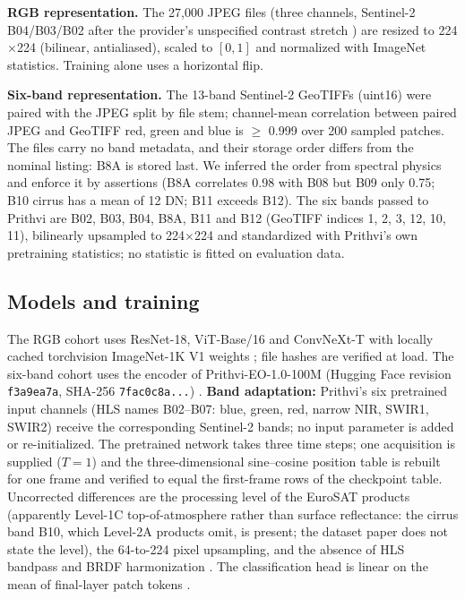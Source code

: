 \documentclass[3p,times,procedia]{elsarticle}
\begin{document}
\textbf{RGB representation.} The 27,000 JPEG files (three channels, Sentinel-2 B04/B03/B02 after the provider's unspecified contrast stretch \cite{eurosat}) are resized to 224$\times$224 (bilinear, antialiased), scaled to $[0,1]$ and normalized with ImageNet statistics. Training alone uses a horizontal flip.

\textbf{Six-band representation.} The 13-band Sentinel-2 GeoTIFFs (uint16) were paired with the JPEG split by file stem; channel-mean correlation between paired JPEG and GeoTIFF red, green and blue is $\ge$ 0.999 over 200 sampled patches. The files carry no band metadata, and their storage order differs from the nominal listing: B8A is stored last. We inferred the order from spectral physics and enforce it by assertions (B8A correlates 0.98 with B08 but B09 only 0.75; B10 cirrus has a mean of 12 DN; B11 exceeds B12). The six bands passed to Prithvi are B02, B03, B04, B8A, B11 and B12 (GeoTIFF indices 1, 2, 3, 12, 10, 11), bilinearly upsampled to 224$\times$224 and standardized with Prithvi's own pretraining statistics; no statistic is fitted on evaluation data.

\subsection{Models and training}\label{sec:models}
The RGB cohort uses ResNet-18, ViT-Base/16 and ConvNeXt-T with locally cached torchvision ImageNet-1K V1 weights \cite{resnet,vit,convnext}; file hashes are verified at load. The six-band cohort uses the encoder of Prithvi-EO-1.0-100M (Hugging Face revision \texttt{f3a9ea7a}, SHA-256 \texttt{7fac0c8a...}) \cite{prithvi,prithvicard}. \textbf{Band adaptation:} Prithvi's six pretrained input channels (HLS names B02--B07: blue, green, red, narrow NIR, SWIR1, SWIR2) receive the corresponding Sentinel-2 bands; no input parameter is added or re-initialized. The pretrained network takes three time steps; one acquisition is supplied ($T{=}1$) and the three-dimensional sine--cosine position table is rebuilt for one frame and verified to equal the first-frame rows of the checkpoint table. Uncorrected differences are the processing level of the EuroSAT products (apparently Level-1C top-of-atmosphere rather than surface reflectance: the cirrus band B10, which Level-2A products omit, is present; the dataset paper does not state the level), the 64-to-224 pixel upsampling, and the absence of HLS bandpass and BRDF harmonization \cite{hls}. The classification head is linear on the mean of final-layer patch tokens \cite{mae}.
\end{document}
